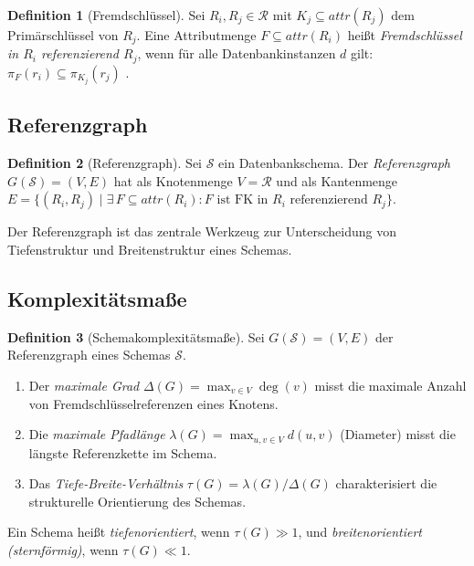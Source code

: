 ﻿\documentclass[a4paper,12pt]{report}
\theoremstyle{definition}
\newtheorem{definition}{Definition}[chapter]
\theoremstyle{remark}
\newcommand{\att}{\mathit{attr}}
\begin{document}
\begin{definition}[Fremdschlüssel]
Sei $R_i, R_j \in \mathcal{R}$ mit $K_j \subseteq \att(R_j)$ dem Primärschlüssel
von $R_j$. Eine Attributmenge $F \subseteq \att(R_i)$ heißt
\emph{Fremdschlüssel in $R_i$ referenzierend $R_j$}, wenn für alle Datenbankinstanzen
$d$ gilt: $\pi_F(r_i) \subseteq \pi_{K_j}(r_j)$ \cite{Date2003}.
\end{definition}

\subsection{Referenzgraph}

\begin{definition}[Referenzgraph]
\label{def:refgraph}
Sei $\mathcal{S}$ ein Datenbankschema. Der \emph{Referenzgraph}
$G(\mathcal{S}) = (V, E)$ hat als Knotenmenge $V = \mathcal{R}$ und als
Kantenmenge $E = \{(R_i, R_j) \mid \exists\, F \subseteq \att(R_i)\colon
F \text{ ist FK in } R_i \text{ referenzierend } R_j\}$.
\end{definition}

Der Referenzgraph ist das zentrale Werkzeug zur Unterscheidung von
Tiefenstruktur und Breitenstruktur eines Schemas.

\subsection{Komplexitätsmaße}

\begin{definition}[Schemakomplexitätsmaße]
\label{def:masse}
Sei $G(\mathcal{S}) = (V, E)$ der Referenzgraph eines Schemas $\mathcal{S}$.
\begin{enumerate}[label=(\roman*)]
  \item Der \emph{maximale Grad} $\Delta(G) = \max_{v \in V} \deg(v)$ misst
        die maximale Anzahl von Fremdschlüsselreferenzen eines Knotens.
  \item Die \emph{maximale Pfadlänge} $\lambda(G) = \max_{u,v \in V} d(u,v)$
        (Diameter) misst die längste Referenzkette im Schema.
  \item Das \emph{Tiefe-Breite-Verhältnis} $\tau(G) = \lambda(G) / \Delta(G)$
        charakterisiert die strukturelle Orientierung des Schemas.
\end{enumerate}
\end{definition}

Ein Schema heißt \emph{tiefenorientiert}, wenn $\tau(G) \gg 1$, und
\emph{breitenorientiert (sternförmig)}, wenn $\tau(G) \ll 1$.
\end{document}

